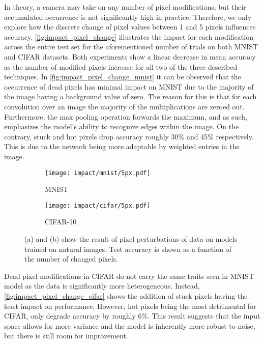 \documentclass[conference]{IEEEtran}
\begin{document}
In theory, a camera may take on any number of pixel modifications, but their accumulated occurrence is not significantly high in practice. Therefore, we only explore how the discrete change of pixel values between 1 and 5 pixels influences accuracy. \autoref{fig:impact_pixel_change} illustrates the impact for each modification across the entire test set for the aforementioned number of trials on both MNIST and CIFAR datasets. Both experiments show a linear decrease in mean accuracy as the number of modified pixels increase for all two of the three described techniques. In \autoref{fig:impact_pixel_change_mnist} it can be observed that the occurrence of dead pixels has minimal impact on MNIST due to the majority of the image having a background value of zero. The reason for this is that for each convolution over an image the majority of the multiplications are zeroed out. Furthermore, the max pooling operation forwards the maximum, and as such, emphasizes the model's ability to recognize edges within the image. On the contrary, stuck and hot pixels drop accuracy roughly 30\% and 45\% respectively. This is due to the network being more adaptable by weighted entries in the image.

\begin{figure}[H]
    \centering
    \begin{subfigure}{0.49\columnwidth}
        \centering
        \texttt{[image: impact/mnist/5px.pdf]}
        \caption{MNIST}
        \label{fig:impact_pixel_change_mnist}
    \end{subfigure}
    \begin{subfigure}{0.49\columnwidth}
        \centering
        \texttt{[image: impact/cifar/5px.pdf]}
        \caption{CIFAR-10}
        \label{fig:impact_pixel_change_cifar}
    \end{subfigure}
    \captionsetup{width=1\columnwidth}
    \caption{(a) and (b) show the result of pixel perturbations of data on models trained on natural images. Test accuracy is shown as a function of the number of changed pixels.}
    \label{fig:impact_pixel_change}
\end{figure}

Dead pixel modifications in CIFAR do not carry the same traits seen in MNIST model as the data is significantly more heterogeneous. Instead, \autoref{fig:impact_pixel_change_cifar} shows the addition of stuck pixels having the least impact on performance. However, hot pixels being the most detrimental for CIFAR, only degrade accuracy by roughly 6\%. This result suggests that the input space allows for more variance and the model is inherently more robust to noise, but there is still room for improvement.
\end{document}
